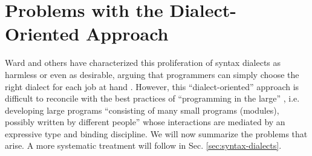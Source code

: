 
\section{Problems with the Dialect-Oriented Approach}\label{sec:problems-with-dialects}
Ward and others have characterized this proliferation of syntax dialects as harmless or even as desirable, arguing that programmers can simply choose the right dialect for each job at hand \cite{journals/stp/Ward94}. However, this ``dialect-oriented'' approach is difficult to reconcile with the best practices of ``programming in the large''  \cite{DeRemer76}, i.e. developing large programs ``consisting of many small programs (modules), possibly written by different people'' whose interactions are mediated by an expressive type and binding discipline. We will now summarize the problems that arise. A more systematic treatment will follow in  Sec. \ref{sec:syntax-dialects}.

